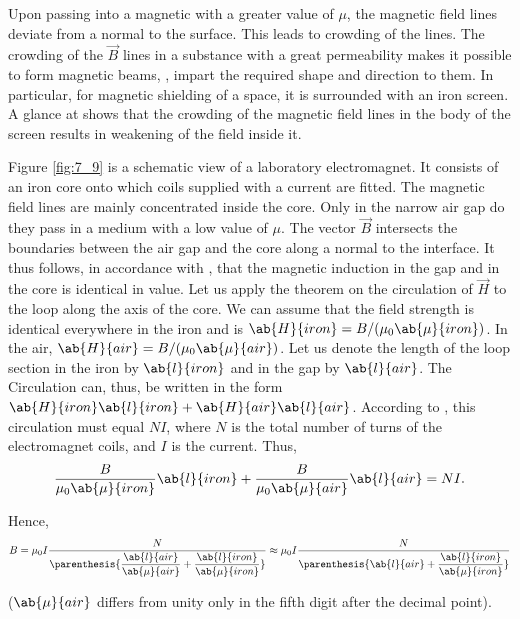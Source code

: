 Upon passing into a magnetic with a greater value of $\mu$, the magnetic field lines deviate from a normal to the surface.
This leads to crowding of the lines.
The crowding of the $\vec{B}$ lines in a substance with a great permeability makes it possible to form magnetic beams, \ie, impart the required shape and direction to them.
In particular, for magnetic shielding of a space, it is surrounded with an iron screen.
A glance at  shows that the crowding of the magnetic field lines in the body of the screen results in weakening of the field inside it.

Figure \ref{fig:7_9} is a schematic view of a laboratory electromagnet.
It consists of an iron core onto which coils supplied with a current are fitted.
The magnetic field lines are mainly concentrated inside the core.
Only in the narrow air gap do they pass in a medium with a low value of $\mu$.
The vector $\vec{B}$ intersects the boundaries between the air gap and the core along a normal to the interface.
It thus follows, in accordance with , that the magnetic induction in the gap and in the core is identical in value.
Let us apply the theorem on the circulation of $\vec{H}$ to the loop along the axis of the core.
We can assume that the field strength is identical everywhere in the iron and is $\ab{H}{iron} = B/(\mu_0\ab{\mu}{iron})$.
In the air, $\ab{H}{air} = B/(\mu_0\ab{\mu}{air})$.
Let us denote the length of the loop section in the iron by $\ab{l}{iron}$ and in the gap by $\ab{l}{air}$.
The Circulation can, thus, be written in the form
$\ab{H}{iron}\ab{l}{iron} + \ab{H}{air}\ab{l}{air}$.
According to , this circulation must equal
$NI$, where $N$ is the total number of turns of the electromagnet coils, and $I$ is the current.
Thus,
\begin{equation*}
    \frac{B}{\mu_0\ab{\mu}{iron}} \ab{l}{iron} + \frac{B}{\mu_0\ab{\mu}{air}} \ab{l}{air} = NI.
\end{equation*}

\noindent
Hence,
\begin{equation*}
    B = \mu_0 I \frac{N}{\parenthesis{\dfrac{\ab{l}{air}}{\ab{\mu}{air}} + \dfrac{\ab{l}{iron}}{\ab{\mu}{iron}}}} \approx \mu_0 I \frac{N}{\parenthesis{\ab{l}{air} + \dfrac{\ab{l}{iron}}{\ab{\mu}{iron}}}}
\end{equation*}

\noindent
($\ab{\mu}{air}$ differs from unity only in the fifth digit after the decimal point).

